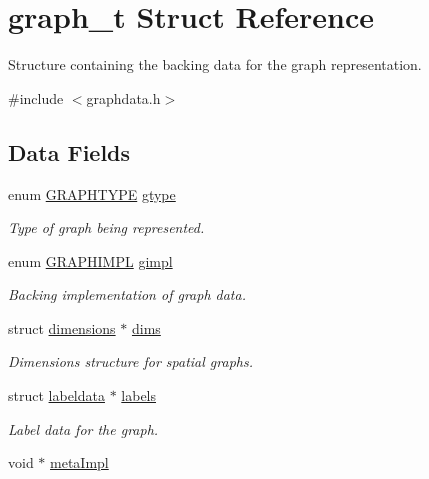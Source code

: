 \hypertarget{structgraph__t}{}\section{graph\+\_\+t Struct Reference}
\label{structgraph__t}


Structure containing the backing data for the graph representation.  




{\ttfamily \#include $<$graphdata.\+h$>$}

\subsection*{Data Fields}
\begin{DoxyCompactItemize}
\item 
enum \hyperlink{graphdata_8h_a384e88b524b782ff50439055cbc8a5c2}{G\+R\+A\+P\+H\+T\+Y\+PE} \hyperlink{structgraph__t_a602be255ab0523e0a5fe28436a29159a}{gtype}
\begin{DoxyCompactList}\small\item\em Type of graph being represented. \end{DoxyCompactList}\item 
enum \hyperlink{graphdata_8h_ad7f3a639f97221897a0429715dccefe6}{G\+R\+A\+P\+H\+I\+M\+PL} \hyperlink{structgraph__t_a220aff118ba6d13c927486099988c03d}{gimpl}
\begin{DoxyCompactList}\small\item\em Backing implementation of graph data. \end{DoxyCompactList}\item 
struct \hyperlink{graphdata_8h_a08b79828d8e700b1ff86fc235a83089f}{dimensions} $\ast$ \hyperlink{structgraph__t_ab0b7dd9b19e20a1564ba1f02ad41511e}{dims}
\begin{DoxyCompactList}\small\item\em Dimensions structure for spatial graphs. \end{DoxyCompactList}\item 
struct \hyperlink{graphdata_8h_a625fc818ed28f282dba71f20cd31b848}{labeldata} $\ast$ \hyperlink{structgraph__t_a2ea51094b5b0a3b3035895948ded5b44}{labels}
\begin{DoxyCompactList}\small\item\em Label data for the graph. \end{DoxyCompactList}\item 
void $\ast$ \hyperlink{structgraph__t_ab11b23897ec5b39d38c3f85581bd313e}{meta\+Impl}

\end{DoxyCompactItemize}
